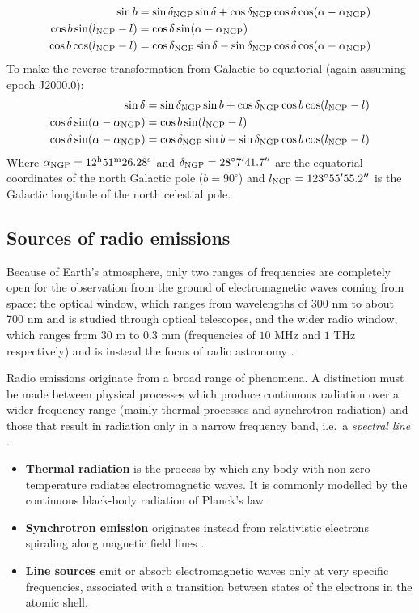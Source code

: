 \begin{align}
    \sin b &= \sin \delta_{\text{NGP}} \sin \delta + \cos \delta_{\text{NGP}} \cos \delta \cos (\alpha - \alpha_{\text{NGP}}) \\
    \cos b \sin(l_{\text{NCP}} - l) &= \cos \delta \sin(\alpha - \alpha_{\text{NGP}}) \\
    \cos b \cos (l_{\text{NCP}} - l) &= \cos \delta_{\text{NGP}} \sin \delta - \sin \delta_{\text{NGP}} \cos \delta \cos(\alpha - \alpha_{\text{NGP}})
\end{align}
To make the reverse transformation from Galactic to equatorial (again assuming epoch J2000.0):
\begin{align}
    \sin \delta &= \sin \delta_{\text{NGP}} \sin b + \cos \delta_{\text{NGP}} \cos b \cos (l_{\text{NCP}} - l) \\
    \cos \delta \sin(\alpha - \alpha_{\text{NGP}}) &= \cos b \sin(l_{\text{NCP}} - l) \\
    \cos \delta \sin(\alpha - \alpha_{\text{NGP}}) &= \cos \delta_{\text{NGP}} \sin b - \sin \delta_{\text{NGP}} \cos b \cos (l_{\text{NCP}} - l)
\end{align}
Where $\alpha_{\text{NGP}} = 12^{\text{h}} 51^{\text{m}} 26.28^{\text{s}}$ and $\delta_{\text{NGP}} = 28^{\circ}7' 41.7''$ are the equatorial coordinates of the north Galactic pole ($b = 90^{\circ}$) and $l_{\text{NCP}} = 123^{\circ} 55' 55.2''$ is the Galactic longitude of the north celestial pole.

\subsection{Sources of radio emissions}
Because of Earth's atmosphere, only two ranges of frequencies are completely open for the observation from the ground of electromagnetic waves coming from space: the optical window, which ranges from {wavelengths of} 300 nm to about 700 nm and is studied through optical telescopes, and the wider radio window, which ranges from $30$ m to $0.3$ mm (frequencies of $10$ MHz and $1$ THz respectively) and is instead the focus of radio astronomy \cite{condon_essential_2016}.

Radio emissions originate from a broad range of phenomena.
A distinction must be made between physical processes which produce continuous radiation over a wider frequency range (mainly thermal processes and synchrotron radiation) and those that result in radiation only in a narrow frequency band, i.e.\ a \emph{spectral line} \cite{lauterbach_radio_2022}.
\begin{itemize}
    \item \textbf{Thermal radiation} is the process by which any body with non-zero temperature radiates electromagnetic waves. It is commonly modelled by the continuous black-body radiation of Planck's law \cite{carroll_introduction_2007}.
    \item \textbf{Synchrotron emission} originates instead from relativistic electrons spiraling along magnetic field lines \cite{maoz_astrophysics_2016}.
    \item \textbf{Line sources} emit or absorb electromagnetic waves only at very specific frequencies, associated with a transition between states of the electrons in the atomic shell.
\end{itemize}

